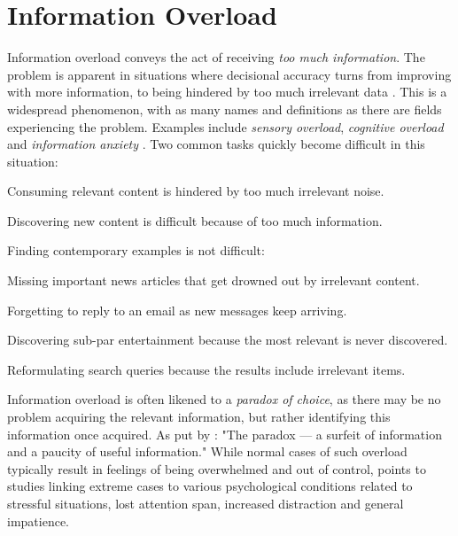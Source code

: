 \section{Information Overload}

Information overload conveys the act of receiving \emph{too much information}. 
The problem is apparent in situations where decisional accuracy turns from improving with more information, 
to being hindered by too much irrelevant data \cite[p13]{Bjorkoy2010d}. 
This is a widespread phenomenon, with as many names and definitions as there are fields experiencing the problem. 
Examples include \emph{sensory overload}, \emph{cognitive overload} and \emph{information anxiety} \cite[p2]{Eppler2004}.
Two common tasks quickly become difficult in this situation:

\begin{enumerate*}
  \item Consuming relevant content is hindered by too much irrelevant noise.
  \item Discovering new content is difficult because of too much information.
\end{enumerate*}

\noindent
Finding contemporary examples is not difficult:

\begin{itemize*}
  \item Missing important news articles that get drowned out by irrelevant content.
  \item Forgetting to reply to an email as new messages keep arriving.
  \item Discovering sub-par entertainment because the most relevant is never discovered.
  \item Reformulating search queries because the results include irrelevant items.
\end{itemize*}

Information overload is often likened to a \emph{paradox of choice}, as there may be no problem acquiring the relevant information, 
but rather identifying this information once acquired. As put by \cite[p6]{Edmunds2000}: 
"The paradox --- a surfeit of information and a paucity of useful information."
While normal cases of such overload typically result in feelings of being overwhelmed and out of control, 
\citet[p5]{Bawden2008} points to studies linking extreme cases to various psychological conditions 
related to stressful situations, lost attention span, increased distraction and general impatience.

